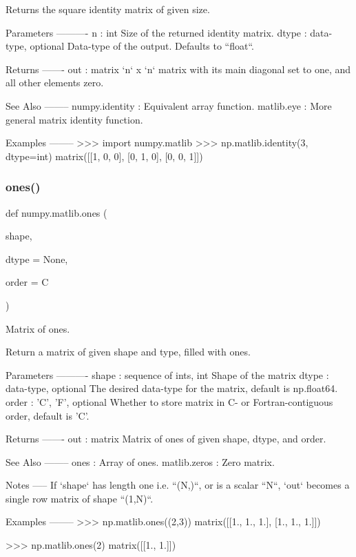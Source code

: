 \begin{DoxyVerb}Returns the square identity matrix of given size.

Parameters
----------
n : int
    Size of the returned identity matrix.
dtype : data-type, optional
    Data-type of the output. Defaults to ``float``.

Returns
-------
out : matrix
    `n` x `n` matrix with its main diagonal set to one,
    and all other elements zero.

See Also
--------
numpy.identity : Equivalent array function.
matlib.eye : More general matrix identity function.

Examples
--------
>>> import numpy.matlib
>>> np.matlib.identity(3, dtype=int)
matrix([[1, 0, 0],
        [0, 1, 0],
        [0, 0, 1]])\end{DoxyVerb}
 \mbox{\label{namespacenumpy_1_1matlib_add2246c8e4ba0232b5df64e88a59599b}} 
\subsubsection{\texorpdfstring{ones()}{ones()}}
{\footnotesize\ttfamily def numpy.\+matlib.\+ones (\begin{DoxyParamCaption}\item[{}]{shape,  }\item[{}]{dtype = {\ttfamily None},  }\item[{}]{order = {\ttfamily \textquotesingle{}C\textquotesingle{}} }\end{DoxyParamCaption})}

\begin{DoxyVerb}Matrix of ones.

Return a matrix of given shape and type, filled with ones.

Parameters
----------
shape : {sequence of ints, int}
    Shape of the matrix
dtype : data-type, optional
    The desired data-type for the matrix, default is np.float64.
order : {'C', 'F'}, optional
    Whether to store matrix in C- or Fortran-contiguous order,
    default is 'C'.

Returns
-------
out : matrix
    Matrix of ones of given shape, dtype, and order.

See Also
--------
ones : Array of ones.
matlib.zeros : Zero matrix.

Notes
-----
If `shape` has length one i.e. ``(N,)``, or is a scalar ``N``,
`out` becomes a single row matrix of shape ``(1,N)``.

Examples
--------
>>> np.matlib.ones((2,3))
matrix([[1.,  1.,  1.],
        [1.,  1.,  1.]])

>>> np.matlib.ones(2)
matrix([[1.,  1.]])\end{DoxyVerb}
 \mbox{\label{namespacenumpy_1_1matlib_a4509084367045a8510ead57c99cafc44}} 
